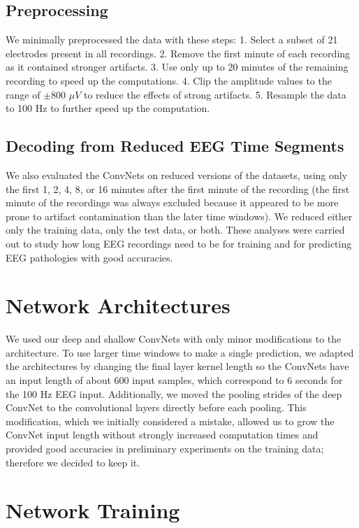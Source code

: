 \subsection{Preprocessing}

    We minimally preprocessed the data with these steps: 1. Select a subset
of 21 electrodes present in all recordings. 2. Remove the first minute
of each recording as it contained stronger artifacts. 3. Use only up to
20 minutes of the remaining recording to speed up the computations. 4.
Clip the amplitude values to the range of $\pm800$ $\mu V$ to reduce
the effects of strong artifacts. 5. Resample the data to 100 Hz to
further speed up the computation.

\subsection{Decoding from Reduced EEG Time
Segments}\label{decoding-from-reduced-eeg-time-segments}

    We also evaluated the ConvNets on reduced versions of the datasets,
using only the first 1, 2, 4, 8, or 16 minutes after the first minute of
the recording (the first minute of the recordings was always excluded
because it appeared to be more prone to artifact contamination than the
later time windows). We reduced either only the training data, only the
test data, or both. These analyses were carried out to study how long
EEG recordings need to be for training and for predicting EEG
pathologies with good accuracies.

\section{Network Architectures}

    We used our deep and shallow ConvNets with only minor modifications to
the architecture. To use larger time windows to make a single
prediction, we adapted the architectures by changing the final layer
kernel length so the ConvNets have an input length of about 600 input
samples, which correspond to 6 seconds for the 100 Hz EEG input.
Additionally, we moved the pooling strides of the deep ConvNet to the
convolutional layers directly before each pooling. This modification,
which we initially considered a mistake, allowed us to grow the ConvNet
input length without strongly increased computation times and provided
good accuracies in preliminary experiments on the training data;
therefore we decided to keep it.

\section{Network Training}\label{network-training}

